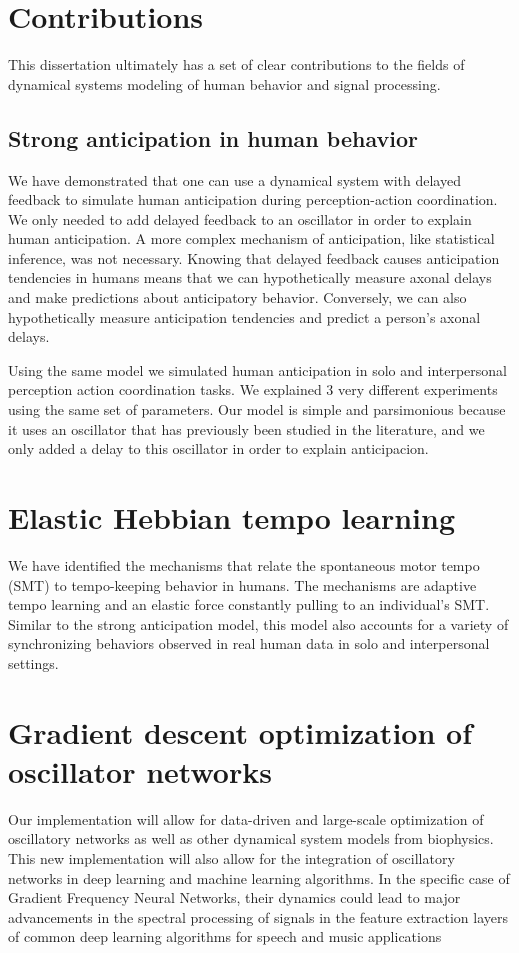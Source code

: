\documentclass{report}
\begin{document}
\section{Contributions}
This dissertation ultimately has a set of clear contributions to the fields of dynamical systems modeling of human behavior and signal processing. 

\subsection{Strong anticipation in human behavior}
We have demonstrated that one can use a dynamical system with delayed feedback to simulate human anticipation during perception-action coordination. We only needed to add delayed feedback to an oscillator in order to explain human anticipation. A more complex mechanism of anticipation, like statistical inference, was not necessary. Knowing that delayed feedback causes anticipation tendencies in humans means that we can hypothetically measure axonal delays and make predictions about anticipatory behavior. Conversely, we can also hypothetically measure anticipation tendencies and predict a person’s axonal delays. 

Using the same model we simulated human anticipation in solo and interpersonal perception action coordination tasks. We explained 3 very different experiments using the same set of parameters. Our model is simple and parsimonious because it uses an oscillator that has previously been studied in the literature, and we only added a delay to this oscillator in order to explain anticipacion. 

\section{Elastic Hebbian tempo learning}
We have identified the mechanisms that relate the spontaneous motor tempo (SMT) to tempo-keeping behavior in humans. The mechanisms are adaptive tempo learning and an elastic force constantly pulling to an individual’s SMT. Similar to the strong anticipation model, this model also accounts for a variety of synchronizing behaviors observed in real human data in solo and interpersonal settings.

\section{Gradient descent optimization of oscillator networks}
Our implementation will allow for data-driven and large-scale optimization of oscillatory networks as well as other dynamical system models from biophysics. This new implementation will also allow for the integration of oscillatory networks in deep learning and machine learning algorithms. In the specific case of Gradient Frequency Neural Networks, their dynamics could lead to major advancements in the spectral processing of signals in the feature extraction layers of common deep learning algorithms for speech and music applications
\end{document}
